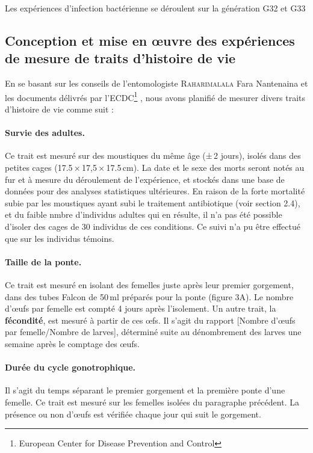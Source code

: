 Les expériences d'infection bactérienne se déroulent sur la génération G32 et G33

\subsection{Conception et mise en \oe{}uvre des expériences de mesure de traits d'histoire de vie}

En se basant sur les conseils de l'entomologiste \textsc{Raharimalala} Fara Nantenaina et les documents délivrés par l'ECDC\footnote{European Center for Disease Prevention and Control} \cite{ecdc}, nous avons planifié de mesurer divers traits d'histoire de vie comme suit :

\paragraph{Survie des adultes.} Ce trait est mesuré sur des moustiques du même âge (±\,2 jours), isolés dans des petites cages (17.5\,×\,17,5\,×\,17.5\,cm). La date et le sexe des morts seront notés au fur et à mesure du déroulement de l'expérience, et stockés dans une base de données pour des analyses statistiques ultérieures.
En raison de la forte mortalité subie par les moustiques ayant subi le traitement antibiotique (voir section 2.4), et du faible nmbre d'individus adultes qui en résulte, il n'a pas été possible d'isoler des cages de 30 individus de ces conditions.
Ce suivi n'a pu être effectué que sur les individus témoins.

\paragraph{Taille de la ponte.} Ce trait est mesuré en isolant des femelles juste après leur premier gorgement, dans des tubes Falcon de 50\,ml préparés pour la ponte (figure 3A). Le nombre d'\oe{}ufs par femelle est compté 4 jours après l'isolement.
Un autre trait, la \textbf{fécondité}, est mesuré à partir de ces \oe{}fs. Il s'agit du rapport [Nombre d'\oe{}ufs par femelle/Nombre de larves], déterminé suite au dénombrement des larves une semaine après le comptage des \oe{}ufs.

\paragraph{Durée du cycle gonotrophique.} Il s'agit du temps séparant le premier gorgement et la première ponte d'une femelle. Ce trait est mesuré sur les femelles isolées du paragraphe précédent. La présence ou non d'\oe{}ufs est vérifiée chaque jour qui suit le gorgement.

